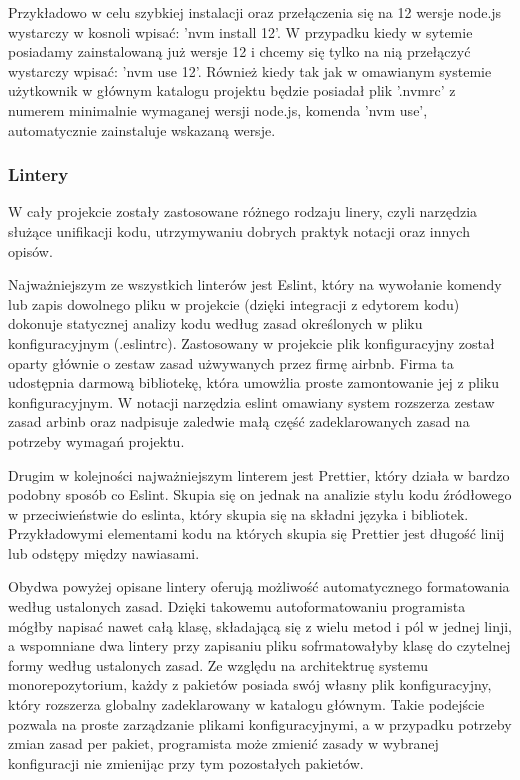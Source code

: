 Przykładowo w celu szybkiej instalacji oraz przełączenia się na 12 wersje node.js wystarczy w kosnoli wpisać: 'nvm install 12'. W przypadku kiedy w sytemie posiadamy zainstalowaną już wersje 12 i chcemy się tylko na nią przełączyć wystarczy wpisać: 'nvm use 12'. Również kiedy tak jak w omawianym systemie użytkownik w głównym katalogu projektu będzie posiadał plik '.nvmrc' z numerem minimalnie wymaganej wersji node.js, komenda 'nvm use', automatycznie zainstaluje wskazaną wersje.


\subsubsection{Lintery}
W cały projekcie zostały zastosowane różnego rodzaju linery, czyli narzędzia służące unifikacji kodu, utrzymywaniu dobrych praktyk notacji oraz innych opisów.

Najważniejszym ze wszystkich linterów jest Eslint, który na wywołanie komendy lub zapis dowolnego pliku w projekcie (dzięki integracji z edytorem kodu) dokonuje statycznej analizy kodu według zasad określonych w pliku konfiguracyjnym (.eslintrc). Zastosowany w projekcie plik konfiguracyjny został oparty głównie o zestaw zasad użwywanych przez firmę airbnb. Firma ta udostępnia darmową bibliotekę, która umowżlia proste zamontowanie jej z pliku konfiguracyjnym. W notacji narzędzia eslint omawiany system rozszerza zestaw zasad arbinb oraz nadpisuje zaledwie małą część zadeklarowanych zasad na potrzeby wymagań projektu.

Drugim w kolejności najważniejszym linterem jest Prettier, który działa w bardzo podobny sposób co Eslint. Skupia się on jednak na analizie stylu kodu źródłowego w przeciwieństwie do eslinta, który skupia się na składni języka i bibliotek. Przykładowymi elementami kodu na których skupia się Prettier jest długość linij lub odstępy między nawiasami.

Obydwa powyżej opisane lintery oferują możliwość automatycznego formatowania według ustalonych zasad. Dzięki takowemu autoformatowaniu programista mógłby napisać nawet całą klasę, składającą się z wielu metod i pól w jednej linji, a wspomniane dwa lintery przy zapisaniu pliku sofrmatowałyby klasę do czytelnej formy według ustalonych zasad. Ze względu na architektruę systemu monorepozytorium, każdy z pakietów posiada swój własny plik konfiguracyjny, który rozszerza globalny zadeklarowany w katalogu głównym. Takie podejście pozwala na proste zarządzanie plikami konfiguracyjnymi, a w przypadku potrzeby zmian zasad per pakiet, programista może zmienić zasady w wybranej konfiguracji nie zmienijąc przy tym pozostałych pakietów.

